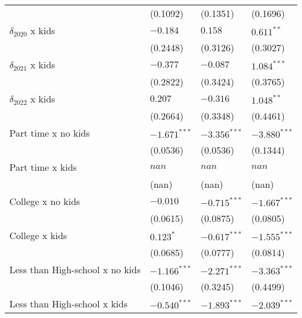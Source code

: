 \begin{tabular}{llll}
                                        &           (0.1092) &           (0.1351) &           (0.1696) \\
$\delta_{2020}$ x kids                  &           $-0.184$ &            $0.158$ &       $0.611^{**}$ \\
                                        &           (0.2448) &           (0.3126) &           (0.3027) \\
$\delta_{2021}$ x kids                  &           $-0.377$ &           $-0.087$ &      $1.084^{***}$ \\
                                        &           (0.2822) &           (0.3424) &           (0.3765) \\
$\delta_{2022}$ x kids                  &            $0.207$ &           $-0.316$ &       $1.048^{**}$ \\
                                        &           (0.2664) &           (0.3348) &           (0.4461) \\
Part time x no kids                     &     $-1.671^{***}$ &     $-3.356^{***}$ &     $-3.880^{***}$ \\
                                        &           (0.0536) &           (0.0536) &           (0.1344) \\
Part time x kids                        &              $nan$ &              $nan$ &              $nan$ \\
                                        &              (nan) &              (nan) &              (nan) \\
College x no kids                       &           $-0.010$ &     $-0.715^{***}$ &     $-1.667^{***}$ \\
                                        &           (0.0615) &           (0.0875) &           (0.0805) \\
College x kids                          &          $0.123^*$ &     $-0.617^{***}$ &     $-1.555^{***}$ \\
                                        &           (0.0685) &           (0.0777) &           (0.0814) \\
Less than High-school x no kids         &     $-1.166^{***}$ &     $-2.271^{***}$ &     $-3.363^{***}$ \\
                                        &           (0.1046) &           (0.3245) &           (0.4499) \\
Less than High-school x kids            &     $-0.540^{***}$ &     $-1.893^{***}$ &     $-2.039^{***}$ \\

\end{tabular}
